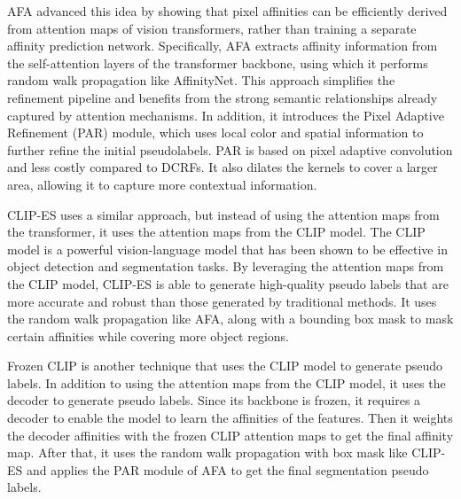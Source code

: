 AFA \cite{wsss_afa_affinity_from_attention} advanced this idea by showing that pixel affinities can be efficiently derived from attention maps of vision transformers, rather than training a separate affinity prediction network. Specifically, AFA extracts affinity information from the self-attention layers of the transformer backbone, using which it performs random walk propagation like AffinityNet. This approach simplifies the refinement pipeline and benefits from the strong semantic relationships already captured by attention mechanisms. In addition, it introduces the Pixel Adaptive Refinement (PAR) module, which uses local color and spatial information to further refine the initial pseudolabels. PAR is based on pixel adaptive convolution and less costly compared to DCRFs. It also dilates the kernels to cover a larger area, allowing it to capture more contextual information.

CLIP-ES \cite{wsss_clip_es} uses a similar approach, but instead of using the attention maps from the transformer, it uses the attention maps from the CLIP model. The CLIP model is a powerful vision-language model that has been shown to be effective in object detection and segmentation tasks. By leveraging the attention maps from the CLIP model, CLIP-ES is able to generate high-quality pseudo labels that are more accurate and robust than those generated by traditional methods. It uses the random walk propagation like AFA, along with a bounding box mask to mask certain affinities while covering more object regions.

Frozen CLIP \cite{wsss_frozen_clip} is another technique that uses the CLIP model to generate pseudo labels. In addition to using the attention maps from the CLIP model, it uses the decoder to generate pseudo labels. Since its backbone is frozen, it requires a decoder to enable the model to learn the affinities of the features. Then it weights the decoder affinities with the frozen CLIP attention maps to get the final affinity map. After that, it uses the random walk propagation with box mask like CLIP-ES and applies the PAR module of AFA to get the final segmentation pseudo labels.

